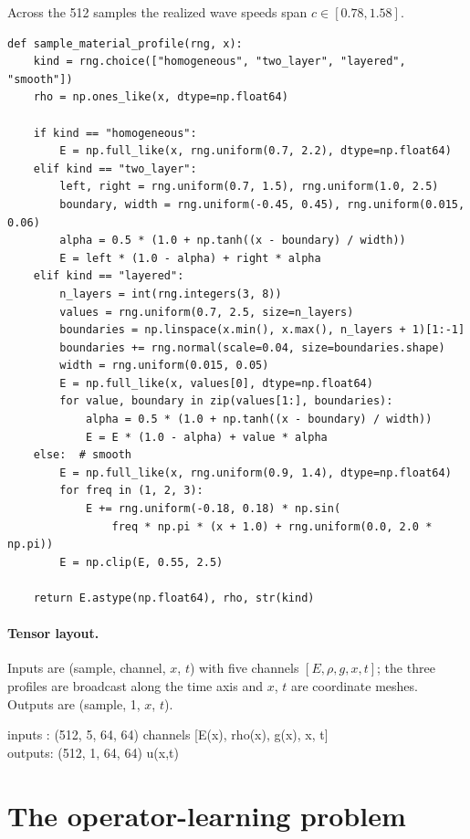 \documentclass[11pt,a4paper]{article}
\begin{document}
\noindent Across the 512 samples the realized wave speeds span
$c\in[0.78,1.58]$.

\begin{lstlisting}
def sample_material_profile(rng, x):
    kind = rng.choice(["homogeneous", "two_layer", "layered", "smooth"])
    rho = np.ones_like(x, dtype=np.float64)

    if kind == "homogeneous":
        E = np.full_like(x, rng.uniform(0.7, 2.2), dtype=np.float64)
    elif kind == "two_layer":
        left, right = rng.uniform(0.7, 1.5), rng.uniform(1.0, 2.5)
        boundary, width = rng.uniform(-0.45, 0.45), rng.uniform(0.015, 0.06)
        alpha = 0.5 * (1.0 + np.tanh((x - boundary) / width))
        E = left * (1.0 - alpha) + right * alpha
    elif kind == "layered":
        n_layers = int(rng.integers(3, 8))
        values = rng.uniform(0.7, 2.5, size=n_layers)
        boundaries = np.linspace(x.min(), x.max(), n_layers + 1)[1:-1]
        boundaries += rng.normal(scale=0.04, size=boundaries.shape)
        width = rng.uniform(0.015, 0.05)
        E = np.full_like(x, values[0], dtype=np.float64)
        for value, boundary in zip(values[1:], boundaries):
            alpha = 0.5 * (1.0 + np.tanh((x - boundary) / width))
            E = E * (1.0 - alpha) + value * alpha
    else:  # smooth
        E = np.full_like(x, rng.uniform(0.9, 1.4), dtype=np.float64)
        for freq in (1, 2, 3):
            E += rng.uniform(-0.18, 0.18) * np.sin(
                freq * np.pi * (x + 1.0) + rng.uniform(0.0, 2.0 * np.pi))
        E = np.clip(E, 0.55, 2.5)

    return E.astype(np.float64), rho, str(kind)
\end{lstlisting}

\paragraph{Tensor layout.} Inputs are (sample, channel, $x$, $t$) with five
channels $[E,\rho,g,x,t]$; the three profiles are broadcast along the time axis
and $x$, $t$ are coordinate meshes. Outputs are (sample, 1, $x$, $t$).

\begin{center}\small\ttfamily
inputs : (512, 5, 64, 64) \quad channels [E(x), rho(x), g(x), x, t]\\
outputs: (512, 1, 64, 64) \quad u(x,t)
\end{center}

\section{The operator-learning problem}
\end{document}
